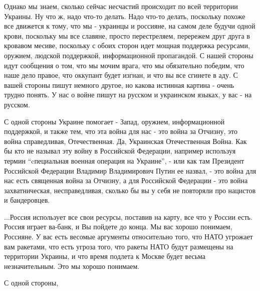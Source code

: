 Однако мы знаем, сколько сейчас несчастий происходит по всей территории
Украины. Ну что ж, надо что-то делать. Надо что-то делать, поскольку похоже все
движется к тому, что мы - украинцы и россияне, на самом деле будучи одной
крови, поскольку мы все славяне, просто перестреляем, перережем друг друга в
кровавом месиве, поскольку с обоих сторон идет мощная поддержка ресурсами,
оружием, людской поддержкой, информационной пропагандой. С нашей стороны идут
сообщения о том, что мы мочим врага, что мы обязательно победим, что наше дело
правое, что оккупант будет изгнан, и что вы все сгинете в аду. С вашей стороны
пишут немного другое, но какова истинная картина - очень трудно понять.  У нас
о войне пишут на русском и украинском языках, у вас - на русском.

С одной стороны Украине помогает - Запад, оружием, информационной поддержкой, и
также тем, что эта война для нас - это война за Отчизну, это война
справедливая, Отечественная. Да, Украинская Отечественная Война. Как бы кто не
называл эту войну в Российской Федерации, например используя термин
\enquote{cпециальная военная операция на Украине}, - или как там Президент
Российской Федерации Владимир Владимирович Путин ее назвал, - это война для нас
есть священная война за Отчизну, а для Российской Федерации - это война
захватническая, несправедливая, сколько бы вы у себя не повторяли про нацистов
и бандеровцев. 

...Россия использует все свои ресурсы, поставив на карту, все что у России
есть. Россия играет ва-банк, и Вы пойдете до конца. Мы вас хорошо понимаем,
Россияне. У вас есть весомые аргументы относительно того, что НАТО угрожает вам
ракетами, что есть угроза того, что ракеты НАТО будут размещены на территории
Украины, и что время подлета к Москве будет весьма незначительным. Это мы
хорошо понимаем. 

С одной стороны,
